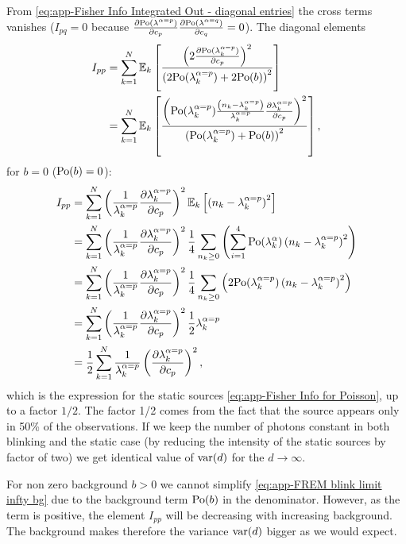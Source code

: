 From \autoref{eq:app-Fisher Info Integrated Out - diagonal entries} the cross terms vanishes ($I_{pq}=0$ because $\frac{\partial\mathrm{Po}(\lambda^{\alpha=p})}{\partial c_p}\frac{\partial\mathrm{Po}(\lambda^{\alpha=q})}{\partial c_{q}}=0$). The diagonal elements 
%
\begin{alignat}{2}
	I_{pp} 
	& =\sum_{k=1}^N\mathbb{E}_k\left[\frac{\left(2\frac{\partial\mathrm{Po}(\lambda_k^{\alpha=p})}{\partial c_p}\right)^2}{\left(2\mathrm{Po}(\lambda_k^{\alpha=p})+2\mathrm{Po}(b)\right)^2}\right]\\
 	& =\sum_{k=1}^N\mathbb{E}_k\left[\frac{\left(\mathrm{Po}(\lambda_k^{\alpha=p})\frac{\left(n_k-\lambda_k^{\alpha=p}\right)}{\lambda_k^{\alpha=p}}\frac{\partial\lambda_k^{\alpha=p}}{\partial c_p}\right)^2}{\left(\mathrm{Po}(\lambda_k^{\alpha=p})+\mathrm{Po}(b)\right)^2}\right],
	\label{eq:app-FREM blink limit infty bg}
\end{alignat}
%
for $b=0$ ($\mathrm{Po}(b)=0$):
%
\begin{alignat}{2}
	I_{pp} 
	 &=\sum_{k=1}^N\left(\frac{1}{\lambda_k^{\alpha=p}}\frac{\partial\lambda_k^{\alpha=p}}{\partial c_p}\right)^2\mathbb{E}_k\left[\left(n_k-\lambda_k^{\alpha=p}\right)^2\right]\nonumber\\
 	& =\sum_{k=1}^N\left(\frac{1}{\lambda_k^{\alpha=p}}\frac{\partial\lambda_k^{\alpha=p}}{\partial c_p}\right)^2\frac{1}{4}\sum_{n_k\geq0}\left(\sum_{i=1}^4\mathrm{Po}(\lambda_k^\alpha)\left(n_k-\lambda_k^{\alpha=p}\right)^2\right)\nonumber\\
 	& =\sum_{k=1}^N\left(\frac{1}{\lambda_k^{\alpha=p}}\frac{\partial\lambda_k^{\alpha=p}}{\partial c_p}\right)^2\frac{1}{4}\sum_{n_k\geq0}\left(2\mathrm{Po}(\lambda_k^{\alpha=p})\left(n_k-\lambda_k^{\alpha=p}\right)^2\right)\nonumber\\
 	& =\sum_{k=1}^N\left(\frac{1}{\lambda_k^{\alpha=p}}\frac{\partial\lambda_k^{\alpha=p}}{\partial c_p}\right)^2\frac{1}{2}\lambda_k^{\alpha=p}\nonumber\\
 	& =\frac{1}{2}\sum_{k=1}^N\frac{1}{\lambda_k^{\alpha=p}}\left(\frac{\partial\lambda_k^{\alpha=p}}{\partial c_p}\right)^2,
\end{alignat}
%
which is the expression for the static sources \autoref{eq:app-Fisher Info for Poisson}, up to a factor $1/2$. The factor 1/2 comes from the fact that the source appears only in 50\% of the observations. If we keep the number of photons constant in both blinking and the static case (by reducing the intensity of the static sources by factor of two) we get identical value of $\mathrm{var}(d)$ for the $d\rightarrow\infty$. 

For non zero background $b>0$ we cannot simplify \autoref{eq:app-FREM blink limit infty bg} due to the background term $\mathrm{Po}(b)$ in the denominator. However, as the term is positive, the element $I_{pp}$ will be decreasing with increasing background. The background makes therefore the variance $\mathrm{var}(d)$ bigger as we would expect.

